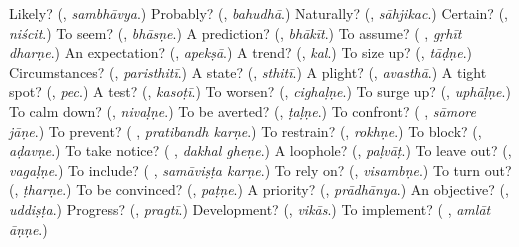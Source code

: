 \begin{tcolorbox}[breakable,colback=teal!4,colframe=teal!35!black,title={Before you move on}]
Likely? (\textbf{}, \emph{sambhāvya}.) Probably? (\textbf{}, \emph{bahudhā}.) Naturally? (\textbf{}, \emph{sāhjikac}.) Certain? (\textbf{}, \emph{niścit}.) To seem? (\textbf{}, \emph{bhāsṇe}.) A prediction? (\textbf{}, \emph{bhākīt}.) To assume? (\textbf{ }, \emph{gṛhīt dharṇe}.) An expectation? (\textbf{}, \emph{apekṣā}.) A trend? (\textbf{}, \emph{kal}.) To size up? (\textbf{}, \emph{tāḍṇe}.) Circumstances? (\textbf{}, \emph{paristhitī}.) A state? (\textbf{}, \emph{sthitī}.) A plight? (\textbf{}, \emph{avasthā}.) A tight spot? (\textbf{}, \emph{pec}.) A test? (\textbf{}, \emph{kasoṭī}.) To worsen? (\textbf{}, \emph{cighaḷṇe}.) To surge up? (\textbf{}, \emph{uphāḷṇe}.) To calm down? (\textbf{}, \emph{nivaḷṇe}.) To be averted? (\textbf{}, \emph{ṭaḷṇe}.) To confront? (\textbf{ }, \emph{sāmore jāṇe}.) To prevent? (\textbf{ }, \emph{pratibandh karṇe}.) To restrain? (\textbf{}, \emph{rokhṇe}.) To block? (\textbf{}, \emph{aḍavṇe}.) To take notice? (\textbf{ }, \emph{dakhal gheṇe}.) A loophole? (\textbf{}, \emph{paḷvāṭ}.) To leave out? (\textbf{}, \emph{vagaḷṇe}.) To include? (\textbf{ }, \emph{samāviṣṭa karṇe}.) To rely on? (\textbf{}, \emph{visambṇe}.) To turn out? (\textbf{}, \emph{ṭharṇe}.) To be convinced? (\textbf{}, \emph{paṭṇe}.) A priority? (\textbf{}, \emph{prādhānya}.) An objective? (\textbf{}, \emph{uddiṣṭa}.) Progress? (\textbf{}, \emph{pragtī}.) Development? (\textbf{}, \emph{vikās}.) To implement? (\textbf{ }, \emph{amlāt āṇṇe}.)
\end{tcolorbox}
